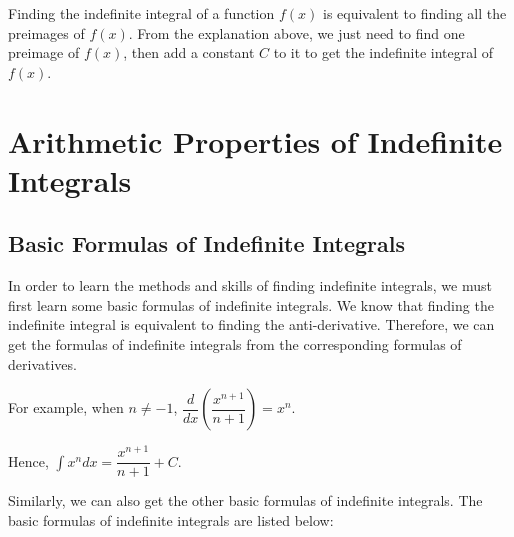 \documentclass{report}
\begin{document}
Finding the indefinite integral of a function $f(x)$ is equivalent to finding
all the preimages of $f(x)$. From the explanation above, we just need to find
one preimage of $f(x)$, then add a constant $C$ to it to get the indefinite
integral of $f(x)$.

\section{Arithmetic Properties of Indefinite Integrals}

\subsection*{Basic Formulas of Indefinite Integrals}

In order to learn the methods and skills of finding indefinite integrals, we
must first learn some basic formulas of indefinite integrals. We know that
finding the indefinite integral is equivalent to finding the anti-derivative.
Therefore, we can get the formulas of indefinite integrals from the
corresponding formulas of derivatives.

For example, when $n \neq -1$, $\dfrac{d}{dx}\left(\dfrac{x^{n+1}}{n+1}\right)
    = x^n$.

Hence, $\displaystyle\int x^{n}dx = \dfrac{x^{n+1}}{n+1} + C$.

Similarly, we can also get the other basic formulas of indefinite integrals.
The basic formulas of indefinite integrals are listed below:
\begin{center}
\end{center}
\vspace{0.9em}
\end{document}
